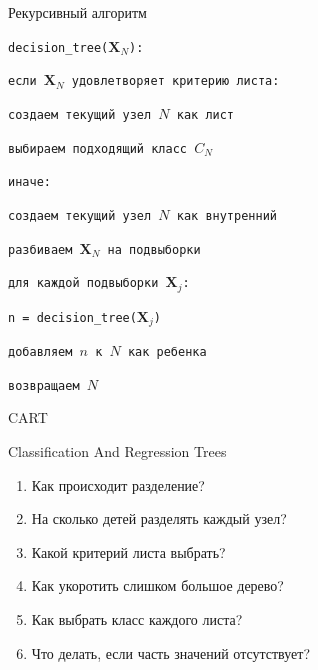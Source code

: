 \documentclass[10pt]{beamer}
\begin{document}

\begin{frame}{Рекурсивный алгоритм}

\texttt{decision\_tree($\mathbf{X}_N$):}

\texttt{\quad если $\mathbf{X}_N$ удовлетворяет критерию листа:}

\texttt{\quad\quad создаем текущий узел $N$ как лист}

\texttt{\quad\quad выбираем подходящий класс $C_N$}

\texttt{\quad иначе:}

\texttt{\quad\quad создаем текущий узел $N$ как внутренний}

\texttt{\quad\quad разбиваем $\mathbf{X}_N$ на подвыборки}

\texttt{\quad\quad для каждой подвыборки $\mathbf X_j$:}

\texttt{\quad\quad\quad n = decision\_tree($\mathbf X_j$)}

\texttt{\quad\quad\quad добавляем $n$ к $N$ как ребенка}

\texttt{\quad возвращаем $N$}

\end{frame}


\begin{frame}{CART}

Classification And Regression Trees

\begin{enumerate}
\item Как происходит разделение?
\item На сколько детей разделять каждый узел?
\item Какой критерий листа выбрать?
\item Как укоротить слишком большое дерево?
\item Как выбрать класс каждого листа?
\item Что делать, если часть значений отсутствует?
\end{enumerate}

\end{frame}

\end{document}
